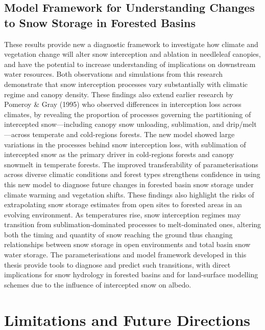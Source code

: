 \documentclass[
  letterpaper,
]{tex/uofsthesis-cs}
\begin{document}
\subsection{Model Framework for Understanding Changes to Snow Storage in
Forested
Basins}\label{model-framework-for-understanding-changes-to-snow-storage-in-forested-basins}

These results provide new a diagnostic framework to investigate how
climate and vegetation change will alter snow interception and ablation
in needleleaf canopies, and have the potential to increase understanding
of implications on downstream water resources. Both observations and
simulations from this research demonstrate that snow interception
processes vary substantially with climatic regime and canopy density.
These findings also extend earlier research by Pomeroy \& Gray (1995)
who observed differences in interception loss across climates, by
revealing the proportion of processes governing the partitioning of
intercepted snow---including canopy snow unloading, sublimation, and
drip/melt---across temperate and cold-regions forests. The new model
showed large variations in the processes behind snow interception loss,
with sublimation of intercepted snow as the primary driver in
cold-regions forests and canopy snowmelt in temperate forests. The
improved transferability of parameterisations across diverse climatic
conditions and forest types strengthens confidence in using this new
model to diagnose future changes in forested basin snow storage under
climate warming and vegetation shifts. These findings also highlight the
risks of extrapolating snow storage estimates from open sites to
forested areas in an evolving environment. As temperatures rise, snow
interception regimes may transition from sublimation-dominated processes
to melt-dominated ones, altering both the timing and quantity of snow
reaching the ground thus changing relationships between snow storage in
open environments and total basin snow water storage. The
parameterisations and model framework developed in this thesis provide
tools to diagnose and predict such transitions, with direct implications
for snow hydrology in forested basins and for land-surface modelling
schemes due to the influence of intercepted snow on albedo.

\section{Limitations and Future
Directions}\label{limitations-and-future-directions}
\end{document}
